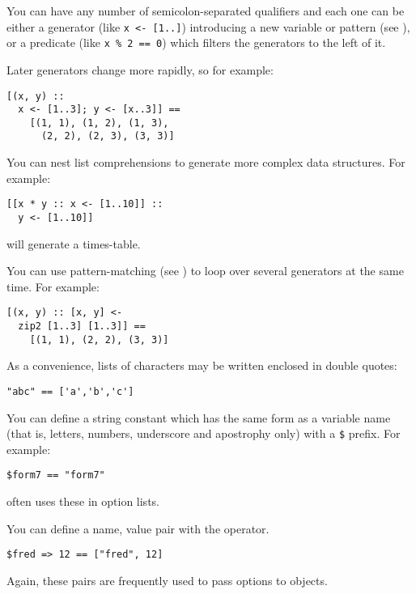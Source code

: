 You can have any number of semicolon-separated qualifiers and each one can
be either a generator (like \verb"x <- [1..]") introducing a new variable
or pattern (see ), or a predicate (like \verb"x % 2 == 0") 
which filters the generators to the left of it.

Later generators change more rapidly, so for example:

\begin{verbatim}
[(x, y) :: 
  x <- [1..3]; y <- [x..3]] ==
    [(1, 1), (1, 2), (1, 3), 
      (2, 2), (2, 3), (3, 3)]
\end{verbatim}

You can nest list comprehensions to generate more complex data structures. For
example:

\begin{verbatim}
[[x * y :: x <- [1..10]] :: 
  y <- [1..10]]
\end{verbatim}

\noindent
will generate a times-table.

You can use pattern-matching (see ) to loop over several 
generators at the same time. For example:

\begin{verbatim}
[(x, y) :: [x, y] <- 
  zip2 [1..3] [1..3]] == 
    [(1, 1), (2, 2), (3, 3)]
\end{verbatim}

As a convenience, lists of characters may be written enclosed in double
quotes:

\begin{verbatim}
"abc" == ['a','b','c']
\end{verbatim}

You can define a string constant which has the same form as a variable name 
(that is, letters, numbers, underscore and apostrophy only) with a \verb+$+
prefix. For example:

\begin{verbatim}
$form7 == "form7"
\end{verbatim}

\noindent
\nip{} often uses these in option lists.

You can define a name, value pair with the \ct{=>} operator. 

\begin{verbatim}
$fred => 12 == ["fred", 12]
\end{verbatim}

\noindent
Again, these pairs are frequently used to pass options to objects.

